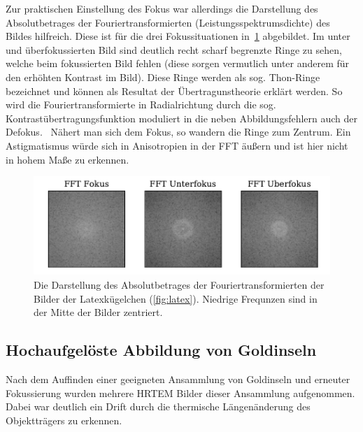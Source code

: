 \documentclass[slug=TEM, room=IFW, supervisor=?, coursedate=23.\ 01.\ 2020]{../../Lab_Report_LaTeX/lab_report}
\begin{document}
Zur praktischen Einstellung des Fokus war allerdings die Darstellung
des Absolutbetrages der Fouriertransformierten
(Leistungsspektrumsdichte) des Bildes hilfreich. Diese ist f\"ur die
drei Fokussituationen in~\ref{fig:latex_kugel-latex_fft}
abgebildet. Im unter und \"uberfokussierten Bild sind deutlich recht
scharf begrenzte Ringe zu sehen, welche beim fokussierten Bild fehlen
(diese sorgen vermutlich unter anderem f\"ur den erh\"ohten Kontrast
im Bild). Diese Ringe werden als sog. Thon-Ringe bezeichnet und
k\"onnen als Resultat der \"Ubertragunstheorie erkl\"art werden. So
wird die Fouriertransformierte in Radialrichtung durch die
sog. Kontrast\"ubertragungsfunktion moduliert in die neben
Abbildungsfehlern auch der Defokus.~\cite{WADE1992145} N\"ahert man
sich dem Fokus, so wandern die Ringe zum Zentrum. Ein Astigmatismus
w\"urde sich in Anisotropien in der FFT \"au\ss{}ern und ist hier
nicht in hohem Ma\ss{}e zu erkennen.

\begin{figure}[h]\centering
  \includegraphics[width=\textwidth]{../auswertung/figs/latex_kugel/latex_fft.pdf}
  \caption{Die Darstellung des Absolutbetrages der
    Fouriertransformierten der Bilder der Latexkügelchen
    (\ref{fig:latex}). Niedrige Frequnzen sind in der Mitte der
    Bilder zentriert.}
  \label{fig:latex_kugel-latex_fft}
\end{figure}

\subsection{Hochaufgel\"oste Abbildung von Goldinseln}
\label{sec:hrtem}

Nach dem Auffinden einer geeigneten Ansammlung von Goldinseln und erneuter
Fokussierung wurden mehrere HRTEM Bilder dieser Ansammlung
aufgenommen. Dabei war deutlich ein Drift durch die thermische
L\"angen\"anderung des Objekttr\"agers zu erkennen.
\end{document}
